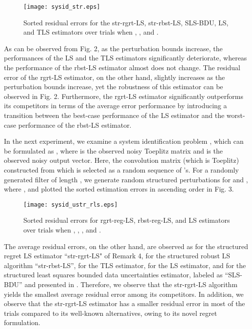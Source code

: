 \documentclass[review,sort&compress]{elsarticle}
\begin{document}
\begin{figure}[t]
  \centering
  \texttt{[image: sysid\_str.eps]}\\
  \caption{Sorted residual errors for the str-rgrt-LS, str-rbst-LS, SLS-BDU, LS, and TLS estimators over  trials when , , and .}\label{fig:sysid_str}
\end{figure}

As can be observed from Fig. 2, as the perturbation bounds increase, the performances of the LS and the TLS estimators significantly deteriorate, whereas the performance of the rbst-LS estimator almost does not change. The residual error of the rgrt-LS estimator, on the other hand, slightly increases as the perturbation bounds increase, yet the robustness of this estimator can be observed in Fig. 2. Furthermore, the rgrt-LS estimator significantly outperforms its competitors in terms of the average error performance by introducing a transition between the best-case performance of the LS estimator and the worst-case performance of the rbst-LS estimator.

In the next experiment, we examine a system identification problem \cite{pilanci10}, which can be formulated as , where  is the observed noisy Toeplitz matrix and  is the observed noisy output vector. Here, the convolution matrix  (which is Toeplitz) constructed from  which is selected as a random sequence of 's. For a randomly generated filter  of length , we generate  random structured perturbations for  and , where , and plotted the sorted estimation errors in ascending order in Fig. 3.

\begin{figure}[t]
  \centering
  \texttt{[image: sysid\_ustr\_rls.eps]}\\
  \caption{Sorted residual errors for rgrt-reg-LS, rbst-reg-LS, and LS estimators over  trials when , , , and .}\label{fig:sysid_ustr_rls}
\end{figure}

The average residual errors, on the other hand, are observed as  for the structured regret LS estimator ``str-rgrt-LS" of Remark 4,  for the structured robust LS algorithm ``str-rbst-LS'',  for the TLS estimator,  for the LS estimator, and  for the structured least squares bounded data uncertainties estimator, labeled as ``SLS-BDU'' and presented in \cite{pilanci10}. Therefore, we observe that the str-rgrt-LS algorithm yields the smallest average residual error among its competitors. In addition, we observe that the str-rgrt-LS estimator has a smaller residual error in most of the trials compared to its well-known alternatives, owing to its novel regret formulation.
\end{document}
